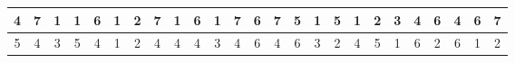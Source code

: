 \begin{sidewaystable}[]
\begin{tabular}{|c|c|c|c|c|c|c|c|c|c|c|c|c|c|c|c|c|c|c|c|c|c|c|c|c|}
    4       & 7                                               & 1                                               & 1                                               & 6                                               & 1                                               & 2                                               & 7                                               & 1                                               & 6                                               & 1                                                & 7                                                & 6                                                 &    7                                               & 5                                               & 1                                               & 5                                               & 1                                               & 2                                               & 3                                               & 4                                               & 6                                               & 4                                                & 6                                                & 7                                                \\ \hline
    5       & 4                                               & 3                                               & 5                                               & 4                                               & 1                                               & 2                                               & 4                                               & 4                                               & 4                                               & 3                                                & 4                                                & 6                                                 &    4                                               & 6                                               & 3                                               & 2                                               & 4                                               & 5                                               & 1                                               & 6                                               & 2                                               & 6                                                & 1                                                & 2                                                \\ \hline

\end{tabular}
\end{sidewaystable}
